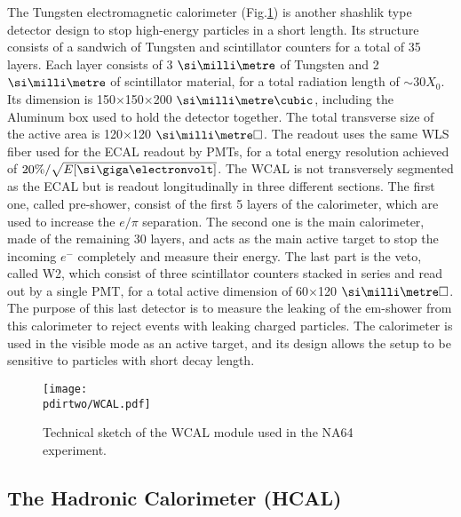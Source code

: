 The Tungsten electromagnetic calorimeter (Fig.\ref{fig:wcal-sketch}) is another shashlik type detector design to stop high-energy particles in a short length. Its structure consists of a sandwich of Tungsten and scintillator counters for a total of 35 layers. Each layer consists of 3 $\mmi$ of Tungsten and 2 $\mmi$ of scintillator material, for a total radiation length of $\sim$30$X_0$. Its dimension is 150$\times$150$\times$200 $\mmc$, including the Aluminum box used to hold the detector together. The total transverse size of the active area is 120$\times$120 $\mms$. The readout uses the same WLS fiber used for the ECAL readout by PMTs, for a total energy resolution achieved of $20\%/ \sqrt{E[\gev]}$. The WCAL is not transversely segmented as the ECAL but is readout longitudinally in three different sections. The first one, called pre-shower, consist of the first 5 layers of the calorimeter, which are used to increase the $e/\pi$ separation. The second one is the main calorimeter, made of the remaining 30 layers, and acts as the main active target to stop the incoming $e^-$ completely and measure their energy. The last part is the veto, called W2, which consist of three scintillator counters stacked in series and read out by a single PMT, for a total active dimension of 60$\times$120 $\mms$. The purpose of this last detector is to measure the leaking of the em-shower from this calorimeter to reject events with leaking charged particles. The calorimeter is used in the visible mode as an active target, and its design allows the setup to be sensitive to particles with short decay length.

\begin{figure}[bth!]
\centering
\texttt{[image: \\pdirtwo/WCAL.pdf]}
\caption[WCAL sketch]{Technical sketch of the WCAL module used in the NA64 experiment.}
\label{fig:wcal-sketch}
\end{figure}


\subsection{The Hadronic Calorimeter (HCAL)}
\label{ch2:sec:detectors-hcal}

